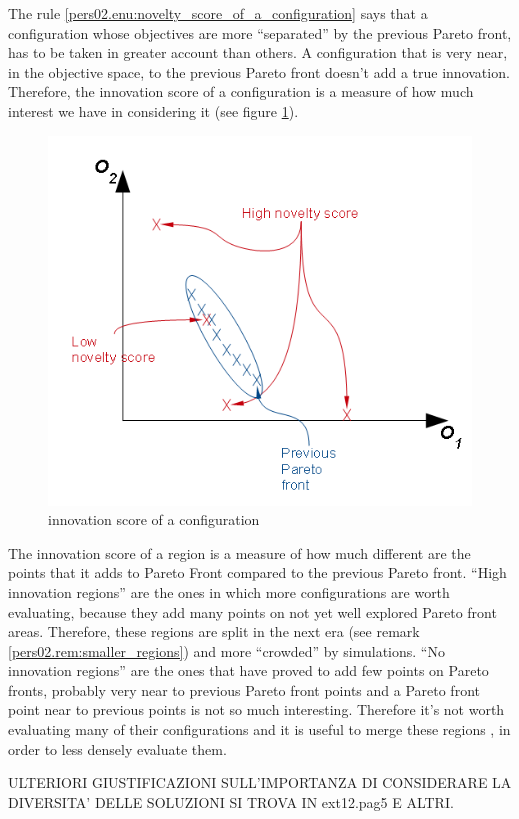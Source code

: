 \begin{rem}
The rule \ref{pers02.enu:novelty_score_of_a_configuration} says that
a configuration whose objectives are more ``separated'' by the previous
Pareto front, has to be taken in greater account than others. A configuration
that is very near, in the objective space, to the previous Pareto
front doesn't add a true innovation. Therefore, the innovation score
of a configuration is a measure of how much interest we have in considering
it (see figure \ref{pers02.fig:Novelty-score-of-a-config}).

\begin{figure}[h]
\includegraphics[width=0.9\columnwidth]{img/novelty_score}

\caption{\label{pers02.fig:Novelty-score-of-a-config}innovation score of a
configuration}


\end{figure}

\end{rem}

\begin{rem}
The innovation score of a region is a measure of how much different
are the points that it adds to Pareto Front compared to the previous
Pareto front. ``High innovation regions'' are the ones in which
more configurations are worth evaluating, because they add many points
on not yet well explored Pareto front areas. Therefore, these regions
are split in the next era (see remark \ref{pers02.rem:smaller_regions})
and more ``crowded'' by simulations. ``No innovation regions''
are the ones that have proved to add few points on Pareto fronts,
probably very near to previous Pareto front points and a Pareto front
point near to previous points is not so much interesting. Therefore
it's not worth evaluating many of their configurations and it is useful
to merge these regions , in order to less densely evaluate them.

ULTERIORI GIUSTIFICAZIONI SULL'IMPORTANZA DI CONSIDERARE LA DIVERSITA'
DELLE SOLUZIONI SI TROVA IN ext12.pag5 E ALTRI.
\end{rem}

